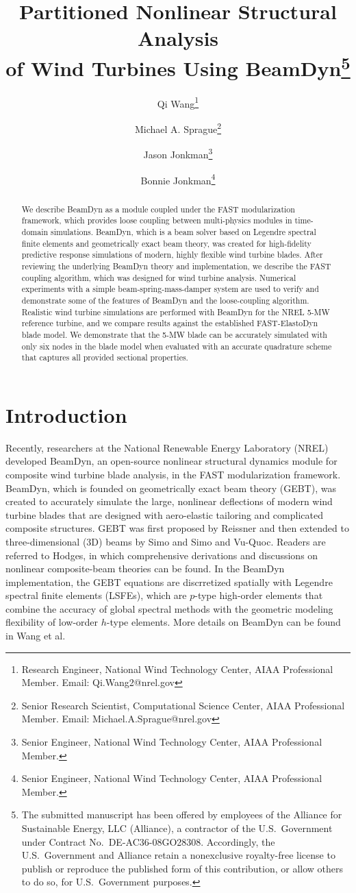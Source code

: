 \documentclass{aiaa-tc}
\title{Partitioned Nonlinear Structural Analysis\\
of Wind Turbines Using BeamDyn\thanks{The submitted manuscript has been offered by employees
of the Alliance for Sustainable Energy, LLC (Alliance), a contractor of the U.S.\
Government under Contract No.\ DE-AC36-08GO28308.  Accordingly, the U.S.\
Government and Alliance retain a nonexclusive royalty-free license to publish or
reproduce the published form of this contribution, or allow others to do so, for
U.S.\ Government purposes.} }
\author[]{Qi Wang\thanks{Research Engineer, National Wind Technology Center, AIAA Professional Member. Email: Qi.Wang2@nrel.gov}}
\author[]{Michael A. Sprague\thanks{Senior Research Scientist, 
Computational Science Center, AIAA Professional Member. Email: Michael.A.Sprague@nrel.gov}}
\author[]{Jason Jonkman\thanks{Senior Engineer, National Wind Technology Center, AIAA Professional Member.}}
\author[]{Bonnie Jonkman\thanks{Senior Engineer, National Wind Technology Center, AIAA Professional Member.}}
\affil[]{National Renewable Energy Laboratory, Golden, CO 80401}
\begin{document}
\maketitle

\begin{abstract}
{We describe BeamDyn as a module coupled under the FAST modularization framework, which provides loose coupling between multi-physics modules in time-domain simulations.
BeamDyn, which is a beam solver based on Legendre spectral finite elements and geometrically exact beam theory, was created for high-fidelity predictive response simulations of modern, highly flexible wind turbine blades.  
After reviewing the underlying BeamDyn theory and implementation, we describe the FAST coupling algorithm, which was designed for wind turbine analysis.  
Numerical experiments with a simple beam-spring-mass-damper system are used to verify and demonstrate some of the features of BeamDyn and the loose-coupling algorithm.  
Realistic wind turbine simulations are performed with BeamDyn for the NREL 5-MW reference turbine, and we compare results against the established FAST-ElastoDyn blade model.  
We demonstrate that the 5-MW blade can be accurately simulated with only six nodes in the blade model  when evaluated with an accurate quadrature scheme that captures all provided sectional properties.}
\end{abstract}

\section{Introduction} 
Recently, researchers at the National Renewable Energy Laboratory (NREL) 
developed BeamDyn\cite{Wang:SFE2013,Wang:GEBT2014,Wang-etal:2015,website:beamdyn}, an open-source nonlinear structural dynamics module for composite wind turbine blade analysis, in the FAST modularization framework.   
BeamDyn, which is founded on geometrically exact beam theory (GEBT), was created to accurately simulate the large, nonlinear deflections of modern wind turbine blades that are designed with aero-elastic tailoring and complicated composite structures.
GEBT was first proposed by Reissner\cite{Ressiner1973} and then extended to three-dimensional (3D) beams by Simo\cite{Simo1985} and Simo and Vu-Quoc\cite{Simo1986}. 
Readers are referred to
Hodges,\cite{HodgesBeamBook} in which comprehensive derivations and discussions
on nonlinear composite-beam theories can be found. 
In the BeamDyn implementation, the GEBT equations are discrretized spatially with Legendre spectral finite elements (LSFEs), which are $p$-type high-order elements that combine the accuracy of global spectral methods with the geometric modeling flexibility of low-order $h$-type elements.
More details on BeamDyn can be found in Wang et al.\cite{Wang:GEBT2014}
\end{document}

